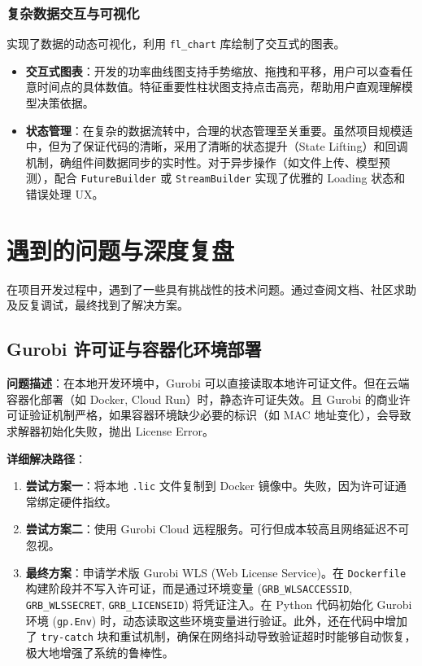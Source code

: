 \subsubsection{复杂数据交互与可视化}
实现了数据的动态可视化，利用 \texttt{fl\_chart} 库绘制了交互式的图表。
\begin{itemize}
    \item \textbf{交互式图表}：开发的功率曲线图支持手势缩放、拖拽和平移，用户可以查看任意时间点的具体数值。特征重要性柱状图支持点击高亮，帮助用户直观理解模型决策依据。
    \item \textbf{状态管理}：在复杂的数据流转中，合理的状态管理至关重要。虽然项目规模适中，但为了保证代码的清晰，采用了清晰的状态提升（State Lifting）和回调机制，确组件间数据同步的实时性。对于异步操作（如文件上传、模型预测），配合 \texttt{FutureBuilder} 或 \texttt{StreamBuilder} 实现了优雅的 Loading 状态和错误处理 UX。
\end{itemize}

\section{遇到的问题与深度复盘}

在项目开发过程中，遇到了一些具有挑战性的技术问题。通过查阅文档、社区求助及反复调试，最终找到了解决方案。

\subsection{Gurobi 许可证与容器化环境部署}
\textbf{问题描述}：在本地开发环境中，Gurobi 可以直接读取本地许可证文件。但在云端容器化部署（如 Docker, Cloud Run）时，静态许可证失效。且 Gurobi 的商业许可证验证机制严格，如果容器环境缺少必要的标识（如 MAC 地址变化），会导致求解器初始化失败，抛出 License Error。

\textbf{详细解决路径}：
\begin{enumerate}
    \item \textbf{尝试方案一}：将本地 \texttt{.lic} 文件复制到 Docker 镜像中。失败，因为许可证通常绑定硬件指纹。
    \item \textbf{尝试方案二}：使用 Gurobi Cloud 远程服务。可行但成本较高且网络延迟不可忽视。
    \item \textbf{最终方案}：申请学术版 Gurobi WLS (Web License Service)。在 \texttt{Dockerfile} 构建阶段并不写入许可证，而是通过环境变量 (\texttt{GRB\_WLSACCESSID}, \texttt{GRB\_WLSSECRET}, \texttt{GRB\_LICENSEID}) 将凭证注入。在 Python 代码初始化 Gurobi 环境 (\texttt{gp.Env}) 时，动态读取这些环境变量进行验证。此外，还在代码中增加了 \texttt{try-catch} 块和重试机制，确保在网络抖动导致验证超时时能够自动恢复，极大地增强了系统的鲁棒性。
\end{enumerate}

